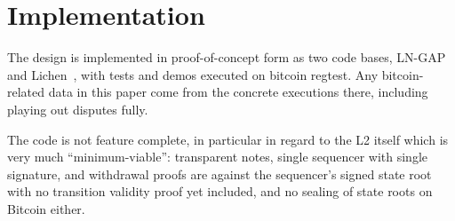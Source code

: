 \documentclass[11pt]{article}
\begin{document}
\section{Implementation}
\label{sec:status}

The design is implemented in proof-of-concept form as two code bases, LN-GAP~\cite{lngapcode} and Lichen~\cite{lichencode}, with tests and demos executed on bitcoin regtest. Any bitcoin-related data in this paper come from the concrete executions there, including playing out disputes fully.

The code is not feature complete, in particular in regard to the L2 itself which is very much ``minimum-viable'': transparent notes, single sequencer with single signature, and withdrawal proofs are against the sequencer's signed state root with no transition validity proof yet included, and no sealing of state roots on Bitcoin either.
\end{document}
